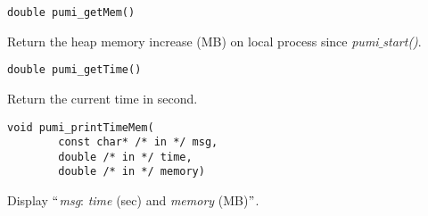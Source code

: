 \begin{verbatim}
double pumi_getMem()
\end{verbatim}\vspace{-.5cm}\hspace{1cm}
	Return the heap memory increase (MB) on local process since \emph{pumi}$\_$\emph{start()}.

\begin{verbatim}
double pumi_getTime()
\end{verbatim}\vspace{-.5cm}\hspace{1cm}
	Return the current time in second.


\begin{verbatim}
void pumi_printTimeMem(
        const char* /* in */ msg, 
        double /* in */ time, 
        double /* in */ memory)
\end{verbatim}\vspace{-.5cm}\hspace{1cm}
        Display $``$\emph{msg}: \emph{time} (sec) and \emph{memory} (MB)$"$.

